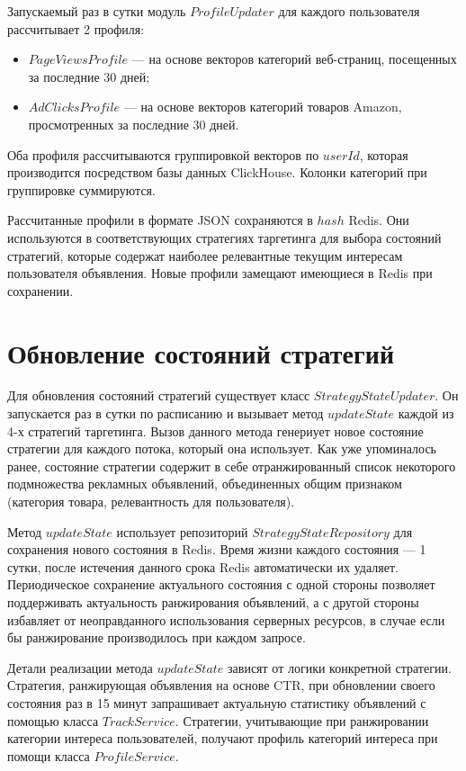 \documentclass[specification,annotation,times]{itmo-student-thesis}
\begin{document}
Запускаемый раз в сутки модуль $ProfileUpdater$ для каждого пользователя рассчитывает 2 профиля:
\begin{itemize}
\item $PageViewsProfile$ — на основе векторов категорий веб-страниц, посещенных за последние 30 дней;
\item $AdClicksProfile$ — на основе векторов категорий товаров Amazon, просмотренных за последние 30 дней.
\end{itemize}
Оба профиля рассчитываются группировкой векторов по $userId$, которая производится посредством базы данных ClickHouse. Колонки категорий при группировке суммируются.


Рассчитанные профили в формате JSON сохраняются в $hash$ Redis.  Они используются в соответствующих стратегиях таргетинга для выбора состояний стратегий, которые содержат наиболее релевантные текущим интересам пользователя объявления. Новые профили замещают имеющиеся в Redis при сохранении.




\section{Обновление состояний стратегий }

Для обновления состояний стратегий существует класс $StrategyStateUpdater$. Он запускается раз в сутки по расписанию и вызывает метод $updateState$ каждой из 4-х стратегий таргетинга. Вызов данного метода генериует новое состояние стратегии для каждого потока, который она использует. Как уже упоминалось ранее, состояние стратегии содержит в себе отранжированный список некоторого подмножества рекламных объявлений, объединенных общим признаком (категория товара, релевантность для пользователя). 

Метод $updateState$ использует репозиторий $StrategyStateRepository$ для сохранения нового состояния в Redis. Время жизни каждого состояния — 1 сутки, после истечения данного срока Redis автоматически их удаляет. Периодическое сохранение актуального состояния с одной стороны позволяет поддерживать актуальность ранжирования объявлений, а с другой стороны избавляет от неоправданного использования серверных ресурсов, в случае если бы ранжирование производилось при каждом запросе.

Детали реализации метода $updateState$ зависят от логики конкретной стратегии. Стратегия, ранжирующая объявления на основе CTR, при обновлении своего состояния раз в 15 минут запрашивает актуальную статистику объявлений с помощью класса $TrackService$. Стратегии, учитывающие при ранжировании категории интереса пользователей, получают профиль категорий интереса при помощи класса $ProfileService$.
\end{document}
